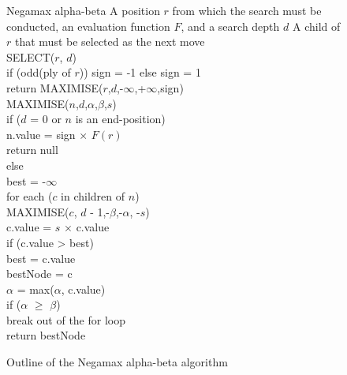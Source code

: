 \begin{figure} [hb]
\begin{algorithm} 
{Negamax alpha-beta}
{A position $r$ from which the search must be conducted, an evaluation function $F$, and a search depth $d$}
{A child of $r$ that must be selected as the next move} 
\\
SELECT($r$, $d$)  \+\\
	if (odd(ply of $r$)) sign = -1 else sign = 1 \\
	return MAXIMISE($r$,$d$,-$\infty$,+$\infty$,sign) \-\\
MAXIMISE($n$,$d$,$\alpha$,$\beta$,$s$) \+\\
	if ($d$ = 0 or $n$ is an end-position) \+\\
	  n.value = sign $\times$ $F(r)$ \\
		return null \-\\
	else \+\\		
			best = -$\infty$ \\
			for each ($c$ in children of $n$) \+\\
				MAXIMISE($c$, $d$ - 1,-$\beta$,-$\alpha$, -$s$) \\
				c.value = $s$ $\times$ c.value \\
				if (c.value > best) \+\\
					best = c.value\\
					bestNode = c\-\\
				$\alpha$ = max($\alpha$, c.value) \\
				if ($\alpha$ $\ge$ $\beta$) \+\\
					break out of the for loop \-\- \\
			return bestNode \\
\end{algorithm}
\caption{Outline of the Negamax alpha-beta algorithm}	
\label{alg:negamax-ab}
\end{figure}

  

